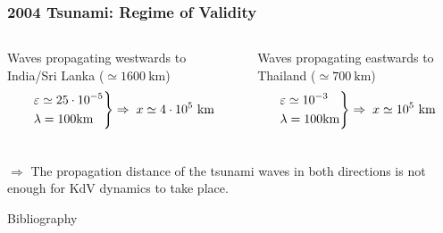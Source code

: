 \documentclass[fleqn]{beamer}
\begin{document}
    \begin{frame}
        \frametitle{2004 Tsunami: Regime of Validity}
        \begin{columns}
            Waves propagating westwards to India/Sri Lanka ($\simeq 1600\ \text{km}$)
            \begin{align}
                \begin{drcases}
                    \varepsilon \simeq 25\cdot 10^{-5}\\
                    \lambda = 100\text{km}
                \end{drcases}\Rightarrow\; x \simeq 4\cdot 10^{5}\ \text{km}\nonumber
            \end{align}

            Waves propagating eastwards to Thailand ($\simeq 700\ \text{km}$)
            \begin{align}
                \begin{drcases}
                    \varepsilon \simeq 10^{-3}\\
                    \lambda = 100\text{km}
                \end{drcases}\Rightarrow\; x \simeq 10^{5}\ \text{km}\nonumber
            \end{align}
        \end{columns}
        \vspace{0.5cm}
        \centering
        $\Rightarrow$ The propagation distance of the tsunami waves in both
        directions is not enough for KdV dynamics to take place.
    \end{frame}

    \begin{frame}{Bibliography}
        \printbibliography
    \end{frame}
\end{document}
